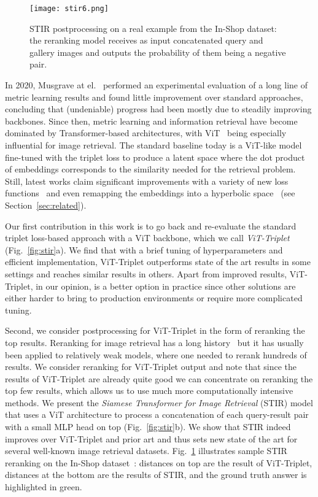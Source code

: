 \documentclass{article}
\begin{document}
\begin{figure}[!t]
    \centering
    \texttt{[image: stir6.png]}
    \caption{STIR postprocessing on a real example from the In-Shop dataset: the reranking model receives as input concatenated query and gallery images and outputs the probability of them being a negative pair.}\label{fig:sample}
\end{figure}

In 2020, Musgrave at el.~\cite{10.1007/978-3-030-58595-2_41} performed an experimental evaluation of a long line of metric learning results and found little improvement over standard approaches, concluding that (undeniable) progress had been mostly due to steadily improving backbones. Since then, metric learning and information retrieval have become dominated by Transformer-based architectures, with ViT~\cite{DBLP:journals/corr/abs-2010-11929} being especially influential for image retrieval. The standard baseline today is a ViT-like model fine-tuned with the triplet loss to produce a latent space where the dot product of embeddings corresponds to the similarity needed for the retrieval problem. Still, latest works claim significant improvements with a variety of new loss functions~\cite{NEURIPS2021_c622c085,patel2022recall} and even remapping the embeddings into a hyperbolic space~\cite{9880306} (see Section~\ref{sec:related}).

Our first contribution in this work is to go back and re-evaluate the standard triplet loss-based approach with a ViT backbone, which we call \emph{ViT-Triplet} (Fig.~\ref{fig:stir}a). We find that with a brief tuning of hyperparameters and efficient implementation, ViT-Triplet outperforms state of the art results in some settings and reaches similar results in others. Apart from improved results, ViT-Triplet, in our opinion, is a better option in practice since other solutions are either harder to bring to production environments or require more complicated tuning.


Second, we consider postprocessing for ViT-Triplet in the form of reranking the top results. Reranking for image retrieval has a long history~\cite{DBLP:journals/corr/NohASH16,8954470,10.1007/978-3-030-58565-5_43,sarlin20superglue,DBLP:conf/iccv/TanYO21} but it has usually been applied to relatively weak models, where one needed to rerank hundreds of results. We consider reranking for ViT-Triplet output and note that since the results of ViT-Triplet are already quite good we can concentrate on reranking the top few results, which allows us to use much more computationally intensive methods. We present the \emph{Siamese Transformer for Image Retrieval} (STIR) model that uses a ViT architecture to process a concatenation of each query-result pair with a small MLP head on top (Fig.~\ref{fig:stir}b). We show that STIR indeed improves over ViT-Triplet and prior art and thus sets new state of the art for several well-known image retrieval datasets. Fig.~\ref{fig:sample} illustrates sample STIR reranking on the In-Shop dataset~\cite{liuLQWTcvpr16DeepFashion}: distances on top are the result of ViT-Triplet, distances at the bottom are the results of STIR, and the ground truth answer is highlighted in green.
\end{document}

